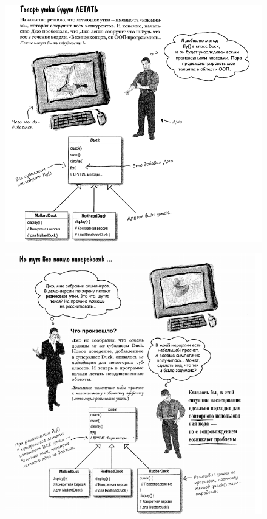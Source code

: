 \documentclass{beamer}
\begin{document}
\begin{frame}
\begin{figure}[h]
\centering
\includegraphics[scale=0.5]{images/lec09-pic03.png}
\label{pic-sort}
\end{figure}
\end{frame}

\begin{frame}
\begin{figure}[h]
\centering
\includegraphics[scale=0.5]{images/lec09-pic04.png}
\label{pic-sort}
\end{figure}
\end{frame}
\end{document}

